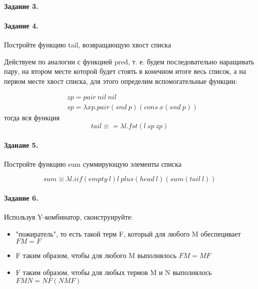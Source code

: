 \documentclass[a4paper,12pt]{article}
\begin{document}
\paragraph{Задание 3.}

\paragraph{Задание 4.} Постройте функцию tail, возвращающую хвост списка

\begin{Solution}
Действуем по аналогии с функцией pred, т. е. будем последовательно наращивать пару, на втором месте которой будет стоять в конечном итоге весь список,
а на первом месте хвост списка, для этого определим вспомогательные функции:

\[
	\begin{split}
		&zp = pair ~nil ~nil\\
		&sp = \lambda xp. pair \left(snd~p\right) \left(cons ~x \left(snd ~p\right)\right)
	\end{split}
\]
тогда вся функция
\[
	tail \equiv = \lambda l . fst\left(l ~sp ~zp\right)
\]
\end{Solution}

\paragraph{Зданаие 5.} Постройте функцию sum суммирующую элементы списка

\begin{Solution}
$$sum \equiv \lambda l . iif\left(empty ~l\right) l ~plus\left(head ~l\right)\left(sum\left(tail ~l\right)\right)$$
\end{Solution}

\paragraph{Задание 6.} Используя Y-комбинатор, сконструируйте:
\begin{itemize}
\item "пожиратель", то есть такой терм F, который для любого M обеспецивает $FM = F$

\item F таким образом, чтобы для любого M выполнялось $FM = MF$

\item F таким образом, чтобы для любых термов M и N выполнялось $FMN = NF\left(NMF\right)$
\end{itemize}
\end{document}
